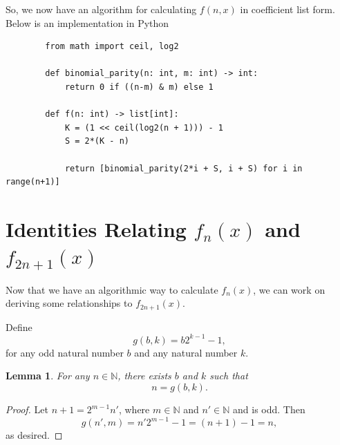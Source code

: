 \documentclass[a4paper]{article}
\newtheorem{lemma}{Lemma}
\newcommand{\N}{\mathbb{N}}
\begin{document}
	So, we now have an algorithm for calculating $f(n,x)$ in coefficient list form.
	Below is an implementation in Python
	\begin{center}
	\begin{verbatim}
		from math import ceil, log2
			
		def binomial_parity(n: int, m: int) -> int:
    		return 0 if ((n-m) & m) else 1
			
		def f(n: int) -> list[int]:
    		K = (1 << ceil(log2(n + 1))) - 1
    		S = 2*(K - n)
			
    		return [binomial_parity(2*i + S, i + S) for i in range(n+1)]
	\end{verbatim}
	\end{center}

	\section{Identities Relating $f_n(x)$ and $f_{2n+1}(x)$}
	Now that we have an algorithmic way to calculate $f_n(x)$, we can work on deriving some relationships to $f_{2n+1}(x)$.
	
	Define
	\begin{equation*}
		g(b,k) = b 2^{k-1} - 1,
	\end{equation*}
	for any odd natural number $b$ and any natural number $k$.
	
	\begin{lemma}
		For any $n \in \N$, there exists $b$ and $k$ such that
		\begin{equation*}
			n = g(b,k).
		\end{equation*}
	\end{lemma}
	\begin{proof}
		Let $n+1 = 2^{m-1}n'$, where $m \in \N$ and $n' \in \N$ and is odd.
		Then
		\begin{equation*}
			g(n', m) = n'2^{m-1} - 1 = (n+1) - 1 = n,
		\end{equation*}
		as desired.
	\end{proof}
	
\end{document}
